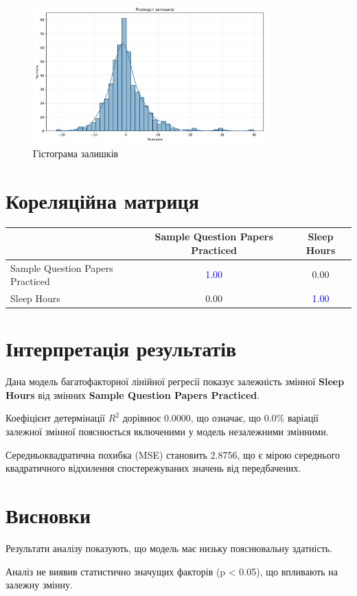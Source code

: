 \documentclass[12pt,a4paper]{article}
\begin{document}
\vspace{0.5cm}

\begin{figure}[H]
    \centering
    \includegraphics[width=0.8\textwidth]{residuals_hist.png}
    \caption{Гістограма залишків}
    \label{fig:гістограма_залишків}
\end{figure}

\vspace{0.5cm}

\section{Кореляційна матриця}

\begin{center}
\begin{tabular}{lcc}
\toprule
& Sample Question Papers Practiced & Sleep Hours \\
\midrule
Sample Question Papers Practiced & \textcolor{blue}{1.00} & 0.00 \\
Sleep Hours & 0.00 & \textcolor{blue}{1.00} \\

\bottomrule
\end{tabular}
\end{center}

\vspace{0.5cm}

\section{Інтерпретація результатів}

Дана модель багатофакторної лінійної регресії показує залежність змінної \textbf{Sleep Hours} від змінних \textbf{Sample Question Papers Practiced}.

Коефіцієнт детермінації $R^2$ дорівнює 0.0000, що означає, що 0.0\% варіації залежної змінної пояснюється включеними у модель незалежними змінними.

Середньоквадратична похибка (MSE) становить 2.8756, що є мірою середнього квадратичного відхилення спостережуваних значень від передбачених.

\vspace{0.5cm}

\section{Висновки}

Результати аналізу показують, що модель має низьку пояснювальну здатність.

Аналіз не виявив статистично значущих факторів (p < 0.05), що впливають на залежну змінну.
\end{document}
